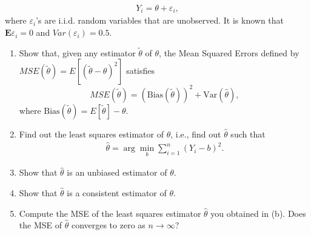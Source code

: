 \documentclass[11pt]{article}
\begin{document}
\begin{enumerate}
    \begin{eqnarray*}
    	Y_i = \theta + \varepsilon_i,
    \end{eqnarray*}
where $\varepsilon_i$'s are i.i.d. random variables that are unobserved. It is known that $\mathbf{E}\varepsilon_i = 0$ and $Var(\varepsilon_i) = 0.5$.
\medskip
\begin{enumerate}
\item Show that, given any estimator $\tilde\theta$ of $\theta$, the Mean Squared Errors defined by $MSE(\tilde\theta)=E[(\tilde\theta-\theta)^2]$ satisfies
\[
MSE(\tilde\theta) = \left(\text{Bias}(\tilde\theta)\right)^2 + \text{Var}(\hat\theta),
\]
where $\text{Bias}(\tilde\theta)=E[\tilde\theta]-\theta$.

	\item Find out the least squares estimator of $\theta$, i.e., find out $\hat \theta$ such that
\begin{eqnarray*}
	\hat \theta = \arg \min_b \sum_{i=1}^n(Y_i - b)^2.
\end{eqnarray*}

      \item Show that $\hat\theta$ is an unbiased estimator of $\theta$. \\
      \item Show that $\hat\theta$ is a consistent estimator of $\theta$.\\
	\item  Compute the MSE of the least squares estimator $\hat \theta$ you obtained in (b). Does the MSE of $\hat \theta$ converges to zero as $n \rightarrow \infty$?



\end{enumerate}
\end{enumerate}
\end{document}
